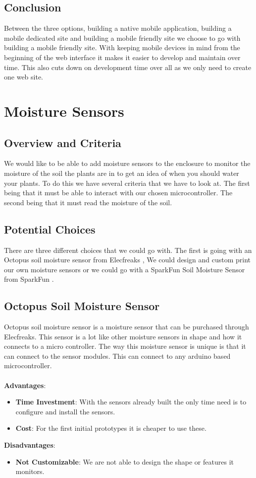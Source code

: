 \documentclass[onecolumn, draftclsnofoot,10pt, compsoc]{IEEEtran}
\begin{document}
		\subsection{Conclusion}
		Between the three options, building a native mobile application, building a
		mobile dedicated site and building a mobile friendly site we choose to go with
		building a mobile friendly site. With keeping mobile devices in mind from the
		beginning of the web interface it makes it easier to develop and maintain over
		time. This also cuts down on development time over all as we only need to
		create one web site.
	\section{Moisture Sensors}
		\subsection{Overview and Criteria}
		We would like to be able to add moisture sensors
		to the enclosure to monitor the moisture of the soil the plants are in to
		get an idea of when you should water your plants. To do this we have several
		criteria that we have to look at. The first being that it must be able to
		interact with our chosen microcontroller. The second being that it must
		read the moisture of the soil.
		\subsection{Potential Choices }
		There are three different choices that we could go with. The first is going
		with an Octopus soil moisture sensor from Elecfreaks \cite[pg 2] {Octopus_soil_sensor},
		We could design and custom print our own moisture sensors or we could go with
		a SparkFun Soil Moisture Sensor from SparkFun \cite[pg 2] {SparkFun_Soil_Moisture_Sensor}.
		\subsection{Octopus Soil Moisture Sensor}
		Octopus soil moisture sensor is a moisture sensor that can be purchased through
		Elecfreaks. This sensor is a lot like other moisture sensors in shape and how
		it connects to a micro controller. The way this moisture sensor is unique is
		that it can connect to the sensor modules. This can connect to any arduino
		based microcontroller.
		\\\\
		\textbf{Advantages}:
		\begin{itemize}
			\item \textbf{Time Investment}: With the sensors already built the only time
			need is to configure and install the sensors.
			\item \textbf{Cost}: For the first initial prototypes it is cheaper to use
			these.
		\end{itemize}
		\noindent\textbf{Disadvantages}:
		\begin{itemize}
			\item \textbf{Not Customizable}: We are not able to design the shape or features
			it monitors.
		\end{itemize}
\end{document}
